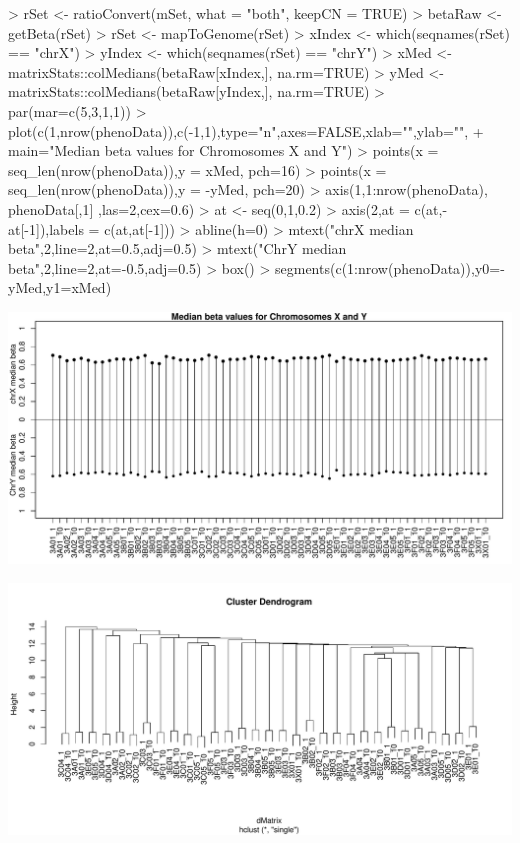 \documentclass[12pt,a4paper]{paper}
\begin{document}
\begin{enumerate}
\begin{enumerate}
\begin{Schunk}
\begin{Sinput}
> rSet <- ratioConvert(mSet, what = "both", keepCN = TRUE)
> betaRaw <- getBeta(rSet)
> rSet <- mapToGenome(rSet)
> xIndex <- which(seqnames(rSet) == "chrX")
> yIndex <- which(seqnames(rSet) == "chrY")
> xMed <- matrixStats::colMedians(betaRaw[xIndex,], na.rm=TRUE)
> yMed <- matrixStats::colMedians(betaRaw[yIndex,], na.rm=TRUE)
> par(mar=c(5,3,1,1))
> plot(c(1,nrow(phenoData)),c(-1,1),type="n",axes=FALSE,xlab="",ylab="",
+ main="Median beta values for Chromosomes X and Y")
> points(x = seq_len(nrow(phenoData)),y = xMed, pch=16)
> points(x = seq_len(nrow(phenoData)),y = -yMed, pch=20)
> axis(1,1:nrow(phenoData), phenoData[,1] ,las=2,cex=0.6)
> at <- seq(0,1,0.2)
> axis(2,at = c(at,-at[-1]),labels = c(at,at[-1]))
> abline(h=0)
> mtext("chrX median beta",2,line=2,at=0.5,adj=0.5)
> mtext("ChrY median beta",2,line=2,at=-0.5,adj=0.5)
> box()
> segments(c(1:nrow(phenoData)),y0=-yMed,y1=xMed)
\end{Sinput}
\end{Schunk}
\includegraphics{Osorio_Daniel_HW3-007}

\begin{Schunk}
\end{Schunk}
\includegraphics{Osorio_Daniel_HW3-008}


\end{enumerate}
\end{enumerate}
\end{document}
